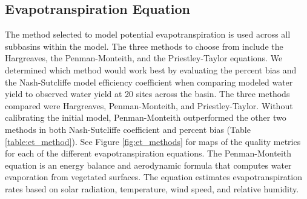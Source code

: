 
\subsection{Evapotranspiration Equation}\label{sec:et_methods}

The method selected to model potential evapotranspiration is used across all subbasins within the model.  The three methods to choose from include the Hargreaves, the Penman-Monteith, and the Priestley-Taylor equations.  We determined which method would work best by evaluating the percent bias and the Nash-Sutcliffe model efficiency coefficient  when comparing modeled water yield to observed water yield at 20 sites across the basin. The three methods compared were Hargreaves, Penman-Monteith, and Priestley-Taylor. Without calibrating the initial model, Penman-Monteith outperformed the other two methods in both Nash-Sutcliffe coefficient and percent bias (Table \ref{table:et_method}). See Figure \ref{fig:et_methods} for maps of the quality metrics for each of the different evapotranspiration equations. The Penman-Monteith equation is an energy balance and aerodynamic formula that computes water evaporation from vegetated surfaces. The equation estimates evapotranspiration rates based on solar radiation, temperature, wind speed, and relative humidity.
